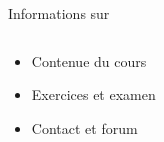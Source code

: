 \begin{frame}{Informations sur} 

  \begin{alertblock}{}

    \begin{columns}
      \begin{column}{.5\textwidth}
        \begin{itemize}
        \item Contenue du cours
         \item Exercices et examen 
         \item Contact et forum
         \end{itemize}
       \end{column}
       \begin{column}{.5\textwidth}
       \end{column}
       
    \end{columns}
      
     \end{alertblock}
          \begin{center}
              
     \end{center}    
    
  
   \end{frame}
   




